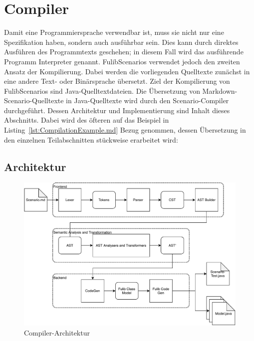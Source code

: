 \section{Compiler}\label{sec:compiler}

Damit eine Programmiersprache verwendbar ist, muss sie nicht nur eine Spezifikation haben, sondern auch ausführbar sein.
Dies kann durch direktes Ausführen des Programmtexts geschehen;
in diesem Fall wird das ausführende Programm Interpreter genannt.
FulibScenarios verwendet jedoch den zweiten Ansatz der Kompilierung.
Dabei werden die vorliegenden Quelltexte zunächst in eine andere Text- oder Binärsprache übersetzt.
Ziel der Kompilierung von FulibScenarios sind Java-Quelltextdateien.
Die Übersetzung von Markdown-Scenario-Quelltexte in Java-Quelltexte wird durch den Scenario-Compiler durchgeführt.
Dessen Architektur und Implementierung sind Inhalt dieses Abschnitts.
Dabei wird des öfteren auf das Beispiel in Listing~\ref{lst:CompilationExample.md} Bezug genommen, dessen Übersetzung in den einzelnen Teilabschnitten stückweise erarbeitet wird:


\subsection{Architektur}\label{subsec:compiler-architecture}


\begin{figure}
	\includegraphics[width=\textwidth]{chapter/fulib-scenarios/img/architecture.pdf}
	\caption{Compiler-Architektur}
	\label{fig:compiler-architecture}
\end{figure}


